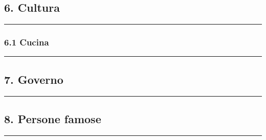 \subsection{6. Cultura}\label{cultura}

\begin{center}\rule{0.5\linewidth}{0.5pt}\end{center}

\subsubsection{6.1 Cucina}\label{cucina}

\begin{center}\rule{0.5\linewidth}{0.5pt}\end{center}

\subsection{7. Governo}\label{governo}

\begin{center}\rule{0.5\linewidth}{0.5pt}\end{center}

\subsection{8. Persone famose}\label{persone-famose}

\begin{center}\rule{0.5\linewidth}{0.5pt}\end{center}
